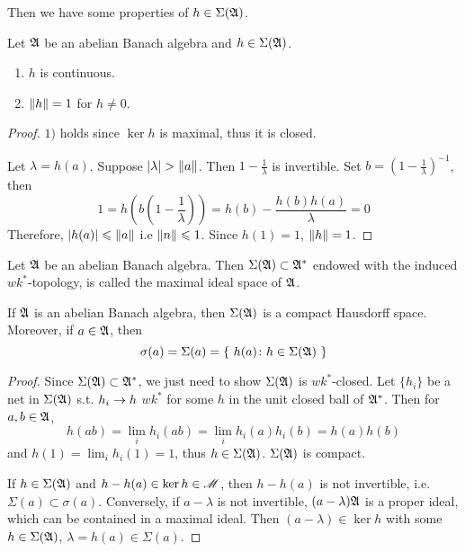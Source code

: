 \documentclass[a4paper,11pt]{report}
\begin{document}
Then we have some properties of $h \in \Sigma(\mathfrak{A})$.

\begin{prop} \label{prop5}
	Let $\mathfrak{A}$ be an abelian Banach algebra and $h \in \Sigma(\mathfrak{A})$.
	\begin{enumerate}[label=\arabic*)]
		\item $h$ is continuous.
		\item $\left\lVert h\right\lVert=1$ for $h \neq 0$.
	\end{enumerate}
\end{prop}
\begin{proof}
	$1)$ holds since $\ker{h}$ is maximal, thus it is closed.
	\item Let $\lambda = h(a)$. Suppose $\left\lvert\lambda\right\lvert > \left\lVert a\right\lVert$. Then $1-\frac{1}{\lambda}$ is invertible. Set $b = (1-\frac{1}{\lambda})^{-1}$, then 
	\begin{equation*}
		1=h(b(1-\frac{1}{\lambda})) = h(b) - \frac{h(b)h(a)}{\lambda} =0
	\end{equation*}
	Therefore, $\left\lvert h(a)\right\lvert \leqslant \left\lVert a\right\lVert$ i.e $\left\lVert n\right\lVert \leqslant 1$. Since $h(1) = 1$, $\left\lVert h\right\lVert=1$.
\end{proof}

\begin{defn}
	Let $\mathfrak{A}$ be an abelian Banach algebra. Then $\Sigma(\mathfrak{A}) \subset \mathfrak{A}^{*}$ endowed with the induced $wk^{*}$-topology, is called the maximal ideal space of $\mathfrak{A}$.
\end{defn}

\begin{prop} \label{prop6}
	If $\mathfrak{A}$ is an abelian Banach algebra, then $\Sigma(\mathfrak{A})$ is a compact Hausdorff space. Moreover, if $a \in \mathfrak{A}$, then
	\begin{equation*}
		\sigma(a) = \Sigma(a) = \{~ h(a) \colon h \in \Sigma(\mathfrak{A}) ~\}
	\end{equation*}
\end{prop}
\begin{proof}
	Since $\Sigma(\mathfrak{A}) \subset \mathfrak{A}^{*}$, we just need to show $\Sigma(\mathfrak{A})$ is $wk^{*}$-closed. Let $\{h_i\}$ be a net in $\Sigma(\mathfrak{A})$ s.t. $h_i \rightarrow h$ $wk^{*}$ for some $h$ in the unit closed ball of $\mathfrak{A}^{*}$. Then for $a,b \in \mathfrak{A}$,
	\begin{equation*}
		h(ab) = \lim_{i} h_i(ab) = \lim_{i} h_i(a)h_i(b) = h(a)h(b)
	\end{equation*}
	and $h(1)=\lim_{i}h_i(1)=1$, thus $h \in \Sigma(\mathfrak{A})$. $\Sigma(\mathfrak{A})$ is compact.
	\item If $h\in \Sigma(\mathfrak{A})$ and $h-h(a) \in \ker{h} \in \mathscr{M}$, then $h-h(a)$ is not invertible, i.e. $\Sigma(a) \subset \sigma(a)$. Conversely, if $a-\lambda$ is not invertible, $(a-\lambda)\mathfrak{A}$ is a proper ideal, which can be contained in a maximal ideal. Then $(a-\lambda) \in \ker{h}$ with some $h \in \Sigma(\mathfrak{A})$, $\lambda = h(a) \in \Sigma(a)$.
\end{proof}
\end{document}
